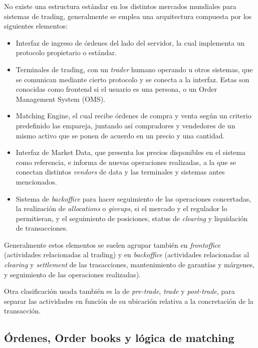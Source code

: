 No existe una estructura estándar en los distintos mercados mundiales para
sistemas de trading, generalmente se emplea una arquitectura compuesta por los
siguientes elementos:
\begin{itemize}
 \item Interfaz de ingreso de órdenes del lado del servidor, la cual implementa
un protocolo propietario o estándar.
 \item Terminales de trading, con un \emph{trader} humano operando u otros
sistemas, que se comunican mediante cierto protocolo y se conecta a la
interfaz. Estas son conocidas como frontend si el usuario es una persona, o un
Order Management System (OMS).
 \item Matching Engine, el cual recibe órdenes de compra y venta según un
criterio predefinido las empareja, juntando así compradores y vendedores de un
mismo activo que se ponen de acuerdo en un precio y una cantidad.
 \item Interfaz de Market Data, que presenta los precios disponibles en el
sistema como referencia, e informa de nuevas operaciones realizadas, a la que
se conectan distintos \emph{vendors} de data y las terminales y sistemas antes
mencionados.
 \item Sistema de \emph{backoffice} para hacer seguimiento de las operaciones
concertadas, la realización de \emph{allocations} o \emph{giveups}, si el
mercado y el regulador lo permitieran, y el seguimiento de posiciones, status
de \emph{clearing} y liquidación de transacciones.
\end{itemize}

Generalmente estos elementos se suelen agrupar también en \emph{frontoffice}
(actividades relacionadas al trading) y en \emph{backoffice} (actividades
relacionadas al \emph{clearing} y \emph{settlement} de las trasacciones,
mantenimiento de garantías y márgenes, y seguimiento de las operaciones
realizadas).

Otra clasificación usada también es la de \emph{pre-trade}, \emph{trade} y
\emph{post-trade}, para separar las actividades en función de su ubicación
relativa a la concretación de la transacción.


\subsection{Órdenes, Order books y lógica de matching}

